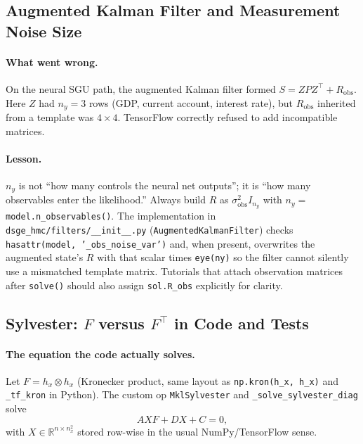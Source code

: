 \documentclass[11pt,a4paper]{article}
\theoremstyle{definition}
\newcommand{\R}{\mathbb{R}}
\newcommand{\code}[1]{\texttt{\color{codecolor}#1}}
\begin{document}
	\subsection{Augmented Kalman Filter and Measurement Noise Size}
	\label{sec:pitfall_akf_r}
	
	\paragraph{What went wrong.}
	On the neural SGU path, the augmented Kalman filter formed $S = Z P Z^\top + R_{\mathrm{obs}}$.
	Here $Z$ had $n_y = 3$ rows (GDP, current account, interest rate), but $R_{\mathrm{obs}}$ inherited from a template was $4 \times 4$.
	TensorFlow correctly refused to add incompatible matrices.
	
	\paragraph{Lesson.}
	$n_y$ is not ``how many controls the neural net outputs''; it is ``how many observables enter the likelihood.''
	Always build $R$ as $\sigma_{\mathrm{obs}}^2 I_{n_y}$ with $n_y = {}$\code{model.n\_observables()}.
	The implementation in \code{dsge\_hmc/filters/\_\_init\_\_.py} (\code{AugmentedKalmanFilter}) checks \code{hasattr(model, '\_obs\_noise\_var')} and, when present, overwrites the augmented state's $R$ with that scalar times \code{eye(ny)} so the filter cannot silently use a mismatched template matrix.
	Tutorials that attach observation matrices after \code{solve()} should also assign \code{sol.R\_obs} explicitly for clarity.
	
	\subsection{Sylvester: $F$ versus $F^\top$ in Code and Tests}
	\label{sec:sylvester_transpose_pitfall}
	
	\paragraph{The equation the code actually solves.}
	Let $F = h_x \otimes h_x$ (Kronecker product, same layout as \code{np.kron(h\_x, h\_x)} and \code{\_tf\_kron} in Python).
	The custom op \code{MklSylvester} and \code{\_solve\_sylvester\_diag} solve
	\begin{equation}\label{eq:sylvester_code_convention}
		A X F + D X + C = 0,
	\end{equation}
	with $X \in \R^{n \times n_x^2}$ stored row-wise in the usual NumPy/TensorFlow sense.
	
\end{document}
